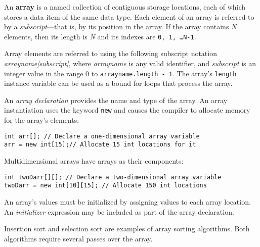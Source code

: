 \begin{SMBL}

\item An {\bf array} is a named collection of contiguous
storage locations, each of which stores a data item of the same data
type.  Each element of an array is referred to by a {\it
subscript}---that is, by its position in the array.
If the array contains {\it N} elements, then its length is {\it N} and
its indexes are {\tt 0, 1, \dots N-1}.  

\item Array elements are referred to using the following subscript
notation {\em arrayname[subscript]}, where {\it arrayname} is any
valid identifier, and {\it subscript} is an integer value in the range
0 to {\tt arrayname.length - 1}. The array's {\tt length} instance
variable can be used as a bound for loops that process the array.

\item An {\it array declaration} provides the name and type of the
array.  An array instantiation uses the keyword {\tt new} and causes
the compiler to allocate memory for the array's elements:

\begin{jjjlisting}
\begin{lstlisting}
int arr[]; // Declare a one-dimensional array variable
arr = new int[15];// Allocate 15 int locations for it
\end{lstlisting}
\end{jjjlisting}

\item Multidimensional arrays have arrays as their components:

\begin{jjjlisting}
\begin{lstlisting}
int twoDarr[][]; // Declare a two-dimensional array variable
twoDarr = new int[10][15]; // Allocate 150 int locations
\end{lstlisting}
\end{jjjlisting}

\item  An array's values must be initialized by assigning
values to each array location.  An {\it initializer} expression may be included as part of the array
declaration.

\item Insertion sort and selection sort are examples of array sorting
algorithms.  Both algorithms require several passes over the array.


\end{SMBL}
